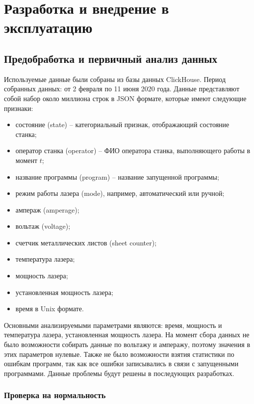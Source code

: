 \section{Разработка и внедрение в эксплуатацию}

\subsection{Предобработка и первичный анализ данных}

Используемые данные были собраны из базы данных ClickHouse.
Период собранных данных: от 2 февраля по 11 июня 2020 года.
Данные представляют собой набор около миллиона строк в JSON формате,
которые имеют следующие признаки:

\begin{itemize}
    \item состояние (state) -- категориальный признак, отображающий состояние станка;
    \item оператор станка (operator) -- ФИО оператора станка, выполняющего работы в момент $t$;
    \item название программы (program) -- название запущенной программы;
    \item режим работы лазера (mode), например, автоматический или ручной;
    \item ампераж (amperage);
    \item вольтаж (voltage);
    \item счетчик металлических листов (sheet counter);
    \item температура лазера;
    \item мощность лазера;
    \item установленная мощность лазера;
    \item время в Unix формате.
\end{itemize}

Основными анализируемыми параметрами являются: время,
мощность и температура лазера, установленная мощность лазера.
На момент сбора данных не было возможности
собирать данные по вольтажу и амперажу,
поэтому значения в этих параметров нулевые.
Также не было возможности взятия статистики
по ошибкам программ, так как все ошибки записывались
в связи с запущенными программами.
Данные проблемы будут решены в последующих разработках.

\subsubsection{Проверка на нормальность}

